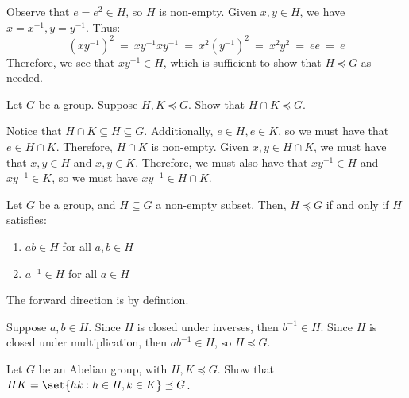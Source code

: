 \documentclass{article}
\begin{document}
\begin{soln}[source=Primary Source Material]
Observe that $ e = e^{2} \in H $, so $ H $ is non-empty. Given $ x, y \in H $, we have $ x = x^{-1}, y = y^{-1} $. Thus:
\begin{equation*}
    (xy^{-1})^{2} \ = \ xy^{-1}xy^{-1} \ = \ x^{2}(y^{-1})^{2} \ = \ x^{2}y^{2} \ = \ ee \ = \ e
\end{equation*}
Therefore, we see that $ xy^{-1} \in H $, which is sufficient to show that $ H \preceq G $ as needed.
\end{soln}

\newpage
\begin{prb}[source=Primary Source Material]
Let $ G $ be a group. Suppose $ H, K \preceq G $. Show that $ H \cap K \preceq G $.
\end{prb}

\begin{soln}[source=Primary Source Material]
Notice that $ H \cap K \subseteq H \subseteq G $. Additionally, $ e \in H, e \in K $, so we must have that $ e \in H \cap K $. Therefore, $ H \cap K $ is non-empty. \vsp
Given $ x, y \in H \cap K $, we must have that $ x, y \in H $ and $ x, y \in K $. Therefore, we must also have that $ xy^{-1} \in H $ and $ xy^{-1} \in K $, so we must have $ xy^{-1} \in H \cap K $.
\end{soln}

\begin{thm}
Let $ G $ be a group, and $ H \subseteq G $ a non-empty subset. Then, $ H \preceq G $ if and only if $ H $ satisfies:
\begin{enumerate}
    \item $ ab \in H $ for all $ a, b \in H $
    \item $ a^{-1} \in H $ for all $ a \in H $
\end{enumerate}
\end{thm}

\begin{pf}[source=Primary Source Material]
The forward direction is by defintion. \npgh

Suppose $ a, b \in H $. Since $ H $ is closed under inverses, then $ b^{-1} \in H $. Since $ H $ is closed under multiplication, then $ ab^{-1} \in H $, so $ H \preceq G $.
\end{pf}

\vspace{-0.15in}
\begin{prb}[source=Primary Source Material]
Let $ G $ be an Abelian group, with $ H, K \preceq G $. Show that $ HK = \set{hk : h \in H, k \in K} \preceq G$.
\end{prb}
\end{document}
